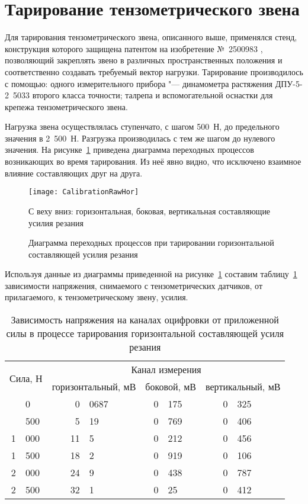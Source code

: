 \section{Тарирование тензометрического звена}

Для тарирования тензометрического звена, описанного выше, применялся стенд, конструкция которого защищена патентом на изобретение №~2500983 \cite{CalibrationStend}, позволяющий закреплять звено в различных пространственных положения и соответственно создавать требуемый вектор нагрузки. Тарирование производилось с помощью: одного измерительного прибора "--- динамометра растяжения ДПУ-5-2~5033 второго класса точности; талрепа и вспомогательной оснастки для крепежа тензометрического звена.

Нагрузка звена осуществлялась ступенчато, с шагом 500~Н, до предельного значения в 2~500~Н. Разгрузка производилась с тем же шагом до нулевого значения. На рисунке~\ref{fig:CalibrationRawHor} приведена диаграмма переходных процессов возникающих во время тарирования. Из неё явно видно, что исключено взаимное влияние составляющих друг на друга.
\begin{figure} [ht]
	\centering
	\texttt{[image: CalibrationRawHor]}
	
	С веху вниз: горизонтальная, боковая, вертикальная составляющие усилия резания
	\caption{Диаграмма переходных процессов при тарировании горизонтальной составляющей усилия резания}  
	\label{fig:CalibrationRawHor}  
\end{figure}
Используя данные из диаграммы приведенной на рисунке~\ref{fig:CalibrationRawHor} составим таблицу~\ref{tab:DCHor} зависимости напряжения, снимаемого с тензометрических датчиков, от прилагаемого, к тензометрическому звену, усилия.
\begin{table}[htp]
	\centering
	\caption{Зависимость напряжения на каналах оцифровки от приложенной силы в процессе тарирования горизонтальной составляющей усиля резания}
	\label{tab:DCHor}
	\begin{tabular}{|r@{ }l|r@{,}l|r@{,}l|r@{,}l|}
		\hline
		\multicolumn{2}{|c|}{\multirow{2}{*}{Сила, Н}} & \multicolumn{6}{c|}{Канал измерения} \tabularnewline
		\cline{3-8}
		\multicolumn{2}{|c|}{}   & \multicolumn{2}{c|}{горизонтальный, мВ}  & \multicolumn{2}{c|}{боковой, мВ} & \multicolumn{2}{c|}{вертикальный, мВ}\tabularnewline
		\hline
		\hline
		&0                          & 0&0687                                               & 0&175         & 0&325\tabularnewline
		&500                        & 5&19                                                 & 0&769         & 0&406\tabularnewline
		1&000                       & 11&5                                                 & 0&212         & 0&456\tabularnewline
		1&500                       & 18&2                                                 & 0&919         & 0&106\tabularnewline
		2&000                       & 24&9                                                 & 0&438         & 0&787\tabularnewline
		2&500                       & 32&1                                                 & 0&25          & 0&412\tabularnewline
		\hline
	\end{tabular}
\end{table}


